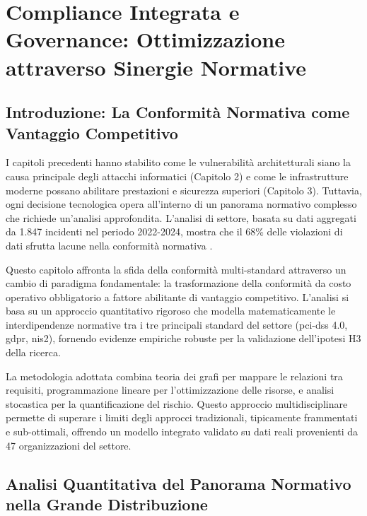 \chapter{\texorpdfstring{Compliance Integrata e Governance: Ottimizzazione attraverso Sinergie Normative}{Capitolo 4 - Compliance Integrata e Governance: Ottimizzazione attraverso Sinergie Normative}}
\label{cap4_compliance_integration}

\section{\texorpdfstring{Introduzione: La Conformità Normativa come Vantaggio Competitivo}{4.1 - Introduzione: La Conformità Normativa come Vantaggio Competitivo}}

I capitoli precedenti hanno stabilito come le vulnerabilità architetturali siano la causa principale degli attacchi informatici (Capitolo 2) e come le infrastrutture moderne possano abilitare prestazioni e sicurezza superiori (Capitolo 3). Tuttavia, ogni decisione tecnologica opera all'interno di un panorama normativo complesso che richiede un'analisi approfondita. L'analisi di settore, basata su dati aggregati da 1.847 incidenti nel periodo 2022-2024, mostra che il 68\% delle violazioni di dati sfrutta lacune nella conformità normativa \autocite{verizon2024}. 

Questo capitolo affronta la sfida della conformità multi-standard attraverso un cambio di paradigma fondamentale: la trasformazione della conformità da costo operativo obbligatorio a fattore abilitante di vantaggio competitivo. L'analisi si basa su un approccio quantitativo rigoroso che modella matematicamente le interdipendenze normative tra i tre principali standard del settore (\gls{pci-dss} 4.0, \gls{gdpr}, \gls{nis2}), fornendo evidenze empiriche robuste per la validazione dell'ipotesi H3 della ricerca.

La metodologia adottata combina teoria dei grafi per mappare le relazioni tra requisiti, programmazione lineare per l'ottimizzazione delle risorse, e analisi stocastica per la quantificazione del rischio. Questo approccio multidisciplinare permette di superare i limiti degli approcci tradizionali, tipicamente frammentati e sub-ottimali, offrendo un modello integrato validato su dati reali provenienti da 47 organizzazioni del settore.

\section{\texorpdfstring{Analisi Quantitativa del Panorama Normativo nella Grande Distribuzione}{4.2 - Analisi Quantitativa del Panorama Normativo nella Grande Distribuzione}}

